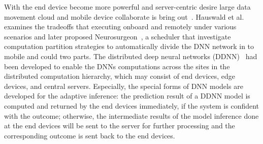 \documentclass[format=acmsmall, review=false, screen=true]{acmart}
\begin{document}


With the end device become more powerful and server-centric desire large data movement cloud and mobile device collaborate is bring out~\cite{Kang2017,Teerapittayanon17,Hauswald2014}. Hauswald et al.~\cite{Hauswald2014} examines the tradeoffs that executing onboard and remotely under various scenarios and later proposed Neurosurgeon~\cite{Kang2017}, a scheduler that investigate computation partition strategies to automatically divide the DNN network in to mobile and could two parts. The distributed deep neural networks (DDNN)~\cite{Teerapittayanon17} had been developed to enable the DNNs computations across the sites in the distributed computation hierarchy, which may consist of end devices, edge devices, and central servers. Especially, the special forms of DNN models are developed for the adaptive inference: the prediction result of a DDNN model is computed and returned by the end devices immediately, if the system is confident with the outcome; otherwise, the intermediate results of the model inference done at the end devices will be sent to the server for further processing and the corresponding outcome is sent back to the end devices.
\end{document}
